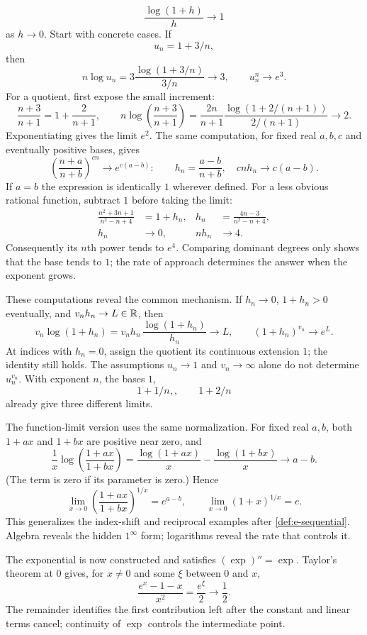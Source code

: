 \[
\frac{\log(1+h)}h\to1
\]
 as $h\to0$.
Start with concrete cases. If
\[
u_n=1+3/n,
\]
 then
\[
n\log u_n=3\frac{\log(1+3/n)}{3/n}\longrightarrow3,
\qquad u_n^n\longrightarrow e^3.
\]
For a quotient, first expose the small increment:
\[
\frac{n+3}{n+1}=1+\frac2{n+1},\qquad
n\log\left(\frac{n+3}{n+1}\right)
=\frac{2n}{n+1}\frac{\log(1+2/(n+1))}{2/(n+1)}\longrightarrow2.
\]
Exponentiating gives the limit $e^2$. The same computation, for fixed real
$a,b,c$ and eventually positive bases, gives
\[
\left(\frac{n+a}{n+b}\right)^{cn}\longrightarrow e^{c(a-b)}:
\qquad h_n=\frac{a-b}{n+b},\quad cn h_n\longrightarrow c(a-b).
\]
If $a=b$ the expression is identically $1$ wherever defined.
For a less obvious rational function, subtract $1$ before taking the limit:
\[
\begin{aligned}
\frac{n^2+3n+1}{n^2-n+4}&=1+h_n,&
h_n&=\frac{4n-3}{n^2-n+4},\\
h_n&\longrightarrow0,&nh_n&\longrightarrow4.
\end{aligned}
\]
Consequently its $n$th power tends to $e^4$. Comparing dominant degrees
only shows that the base tends to $1$; the rate of approach determines the
answer when the exponent grows.

These computations reveal the common mechanism. If $h_n\to0$,
$1+h_n>0$ eventually, and $v_nh_n\to L\in\mathbb{R}$, then
\[
v_n\log(1+h_n)=v_nh_n\,\frac{\log(1+h_n)}{h_n}\longrightarrow L,
\qquad (1+h_n)^{v_n}\longrightarrow e^L.
\]
At indices with $h_n=0$, assign the quotient its continuous extension $1$;
the identity still holds. The assumptions $u_n\to1$ and $v_n\to\infty$
alone do not determine $u_n^{v_n}$. With exponent $n$, the bases
$1$,
\[
1+1/n,,\qquad 1+2/n
\]
 already give three different limits.

The function-limit version uses the same normalization. For fixed real
$a,b$, both $1+ax$ and $1+bx$ are positive near zero, and
\[
\frac1x\log\left(\frac{1+ax}{1+bx}\right)
=\frac{\log(1+ax)}x-\frac{\log(1+bx)}x\longrightarrow a-b.
\]
(The term is zero if its parameter is zero.) Hence
\[
\lim_{x\to0}\left(\frac{1+ax}{1+bx}\right)^{1/x}=e^{a-b},
\qquad \lim_{x\to0}(1+x)^{1/x}=e.
\]
This generalizes the index-shift and reciprocal examples after
\cref{def:e-sequential}. Algebra reveals the hidden $1^\infty$ form;
logarithms reveal the rate that controls it.

\begin{example}
The exponential is now constructed and satisfies $(\exp)''=\exp$.
Taylor's theorem at $0$ gives, for $x\ne0$ and some $\xi$ between $0$ and $x$,
\[
\frac{e^x-1-x}{x^2}=\frac{e^\xi}{2}\longrightarrow\frac12.
\]
The remainder identifies the first contribution left after the constant and
linear terms cancel; continuity of $\exp$ controls the intermediate point.
\end{example}

